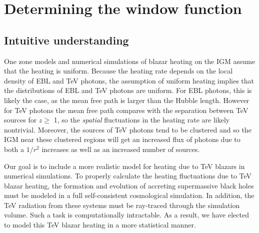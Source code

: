 \documentclass[twocolumns]{emulateapj}
\begin{document}
{%








\section {Determining the window function}\label{window}
\subsection{Intuitive understanding}
One zone models \citep{2012ApJ...752...23C,2012ApJ...752...24P} and numerical simulations  \citep{2012MNRAS.423..149P} of blazar heating on the IGM assume that the heating is uniform.  Because the heating rate depends on the local density of EBL and TeV photons, the assumption of uniform heating implies that the distributions of EBL and TeV photons are uniform.  For EBL photons, this is likely the case, as the mean free path is larger than the Hubble length. However for TeV photons the mean free path compares with the separation between TeV sources for $z\geqslant$ 1, so the {\it spatial} fluctuations in the heating rate are likely nontrivial. Moreover, the sources of TeV photons tend to be clustered and so the IGM near these clustered regions will get an increased flux of photons due to both a $1/r^2$ increases as well as an increased number of sources.



Our goal is to include a more realistic model for heating due to TeV blazars in numerical simulations.
To properly calculate the heating fluctuations due to TeV blazar heating, the formation and evolution of accreting supermassive black holes must be modeled in a full self-consistent cosmological simulation.  In addition, the TeV radiation from these systems must be ray-traced through the simulation volume.  Such a task is computationally intractable.  As a result, we have elected to model this TeV blazar heating in a more statistical manner.  

}
\end{document}

